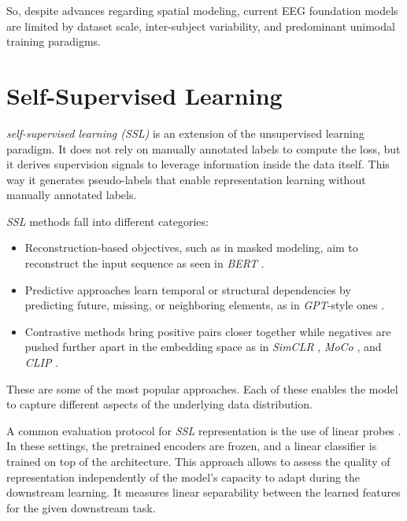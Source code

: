 So, despite advances regarding spatial modeling, current EEG foundation models are limited by dataset scale,
inter-subject variability, and predominant unimodal training paradigms.

\section{Self-Supervised Learning}
\textit{self-supervised learning (SSL)} \cite{oord2019representationlearningcontrastivepredictive, gui2024surveyselfsupervisedlearningalgorithms} is an extension of the unsupervised learning paradigm.
It does not rely on manually annotated labels to compute the loss, but it derives supervision signals to leverage information inside the data itself.
This way it generates pseudo-labels that enable representation learning without manually annotated labels.

\textit{SSL} methods fall into different categories:
\begin{itemize}
    \item Reconstruction-based objectives, such as in masked modeling, aim to reconstruct the input sequence as seen in \textit{BERT} \cite{devlin2019bertpretrainingdeepbidirectional}.
    \item Predictive approaches learn temporal or structural dependencies by predicting future, missing, or neighboring elements, as in \textit{GPT}-style ones \cite{OpenAI_GPT4_2023}.
    \item Contrastive methods bring positive pairs closer together while negatives are pushed further apart in the embedding space as in \textit{SimCLR} \cite{chen2020simpleframeworkcontrastivelearning}, \textit{MoCo} \cite{he2020momentumcontrastunsupervisedvisual}, and \textit{CLIP} \cite{radford2021learningtransferablevisualmodels}.
\end{itemize}

These are some of the most popular approaches. Each of these enables the model to capture different aspects of the underlying data distribution.

A common evaluation protocol for \textit{SSL} representation is the use of linear probes \cite{alain2018understandingintermediatelayersusing}.
In these settings, the pretrained encoders are frozen, and
a linear classifier is trained on top of the architecture.
This approach allows to assess the quality of representation independently of the model's capacity to adapt during the downstream learning.
It measures linear separability between the learned features for the given downstream task.

